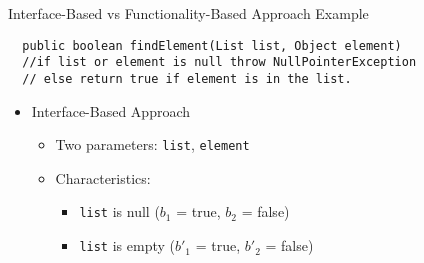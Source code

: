 \documentclass{beamer}
\begin{document}
\begin{frame}[fragile]{Interface-Based vs Functionality-Based Approach Example}
\begin{verbatim}
  public boolean findElement(List list, Object element)
  //if list or element is null throw NullPointerException
  // else return true if element is in the list.
\end{verbatim}
\begin{itemize}
 \item Interface-Based Approach
   \begin{itemize}
    \item Two parameters: {\tt list}, {\tt element}
    \item Characteristics:
      \begin{itemize}
       \item {\tt list} is null ($b_1$ = true, $b_2$ = false)
       \item {\tt list} is empty ($b'_1$ = true, $b'_2$ = false)
       \end{itemize}
    \end{itemize}
\end{itemize}
\end{frame}
%
\end{document}
